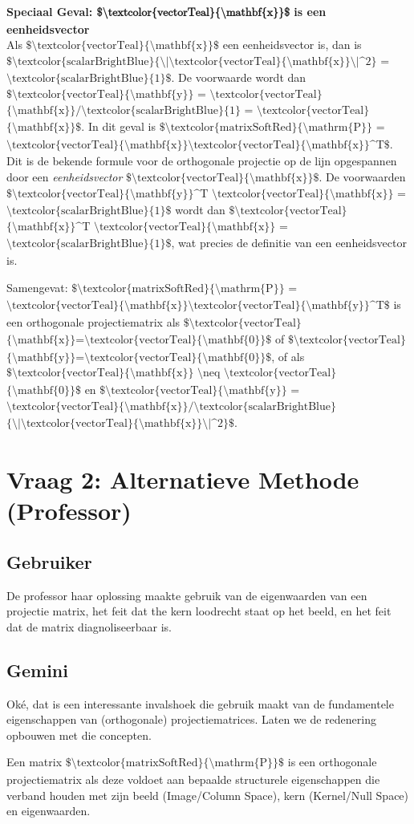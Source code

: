 \documentclass[12pt,a4paper]{article}
\newcommand{\vect}[1]{\textcolor{vectorTeal}{\mathbf{#1}}}
\newcommand{\mat}[1]{\textcolor{matrixSoftRed}{\mathrm{#1}}}
\newcommand{\scal}[1]{\textcolor{scalarBrightBlue}{#1}}
\newcommand{\hdr}[1]{\textcolor{headerBrown}{#1}}
\begin{document}
\textbf{\hdr{Speciaal Geval: $\vect{x}$ is een eenheidsvector}} \\
Als $\vect{x}$ een eenheidsvector is, dan is $\scal{\|\vect{x}\|^2} = \scal{1}$. De voorwaarde wordt dan $\vect{y} = \vect{x}/\scal{1} = \vect{x}$. In dit geval is $\mat{P} = \vect{x}\vect{x}^T$. Dit is de bekende formule voor de orthogonale projectie op de lijn opgespannen door een \textit{\hdr{eenheidsvector}} $\vect{x}$. De voorwaarden $\vect{y}^T \vect{x} = \scal{1}$ wordt dan $\vect{x}^T \vect{x} = \scal{1}$, wat precies de definitie van een eenheidsvector is.

Samengevat: $\mat{P} = \vect{x}\vect{y}^T$ is een orthogonale projectiematrix als $\vect{x}=\vect{0}$ of $\vect{y}=\vect{0}$, of als $\vect{x} \neq \vect{0}$ en $\vect{y} = \vect{x}/\scal{\|\vect{x}\|^2}$.

\section*{Vraag 2: Alternatieve Methode (Professor)}

\subsection*{Gebruiker}

De professor haar oplossing maakte gebruik van de eigenwaarden van een projectie matrix, het feit dat the kern loodrecht staat op het beeld, en het feit dat de matrix diagnoliseerbaar is.

\subsection*{Gemini}

Oké, dat is een interessante invalshoek die gebruik maakt van de fundamentele eigenschappen van (orthogonale) projectiematrices. Laten we de redenering opbouwen met die concepten.

Een matrix $\mat{P}$ is een orthogonale projectiematrix als deze voldoet aan bepaalde structurele eigenschappen die verband houden met zijn beeld (Image/Column Space), kern (Kernel/Null Space) en eigenwaarden.
\end{document}
